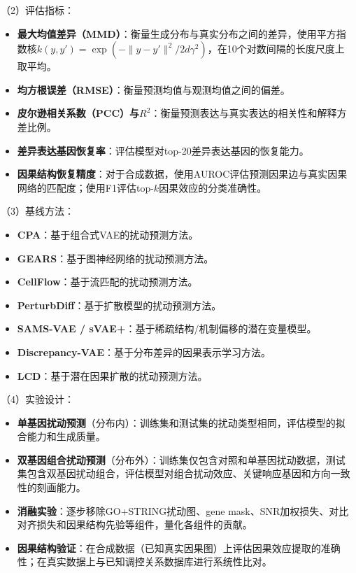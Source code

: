 （2）评估指标：
\begin{itemize}
    \item \textbf{最大均值差异（MMD）}：衡量生成分布与真实分布之间的差异，使用平方指数核$k(y, y') = \exp(-\|y-y'\|^2 / 2d\gamma^2)$，在10个对数间隔的长度尺度上取平均。
    \item \textbf{均方根误差（RMSE）}：衡量预测均值与观测均值之间的偏差。
    \item \textbf{皮尔逊相关系数（PCC）与$R^2$}：衡量预测表达与真实表达的相关性和解释方差比例。
    \item \textbf{差异表达基因恢复率}：评估模型对top-20差异表达基因的恢复能力。
    \item \textbf{因果结构恢复精度}：对于合成数据，使用AUROC评估预测因果边与真实因果网络的匹配度；使用F1评估top-$k$因果效应的分类准确性。
\end{itemize}

（3）基线方法：
\begin{itemize}
    \item \textbf{CPA}\cite{lotfollahi2023contextualization}：基于组合式VAE的扰动预测方法。
    \item \textbf{GEARS}\cite{roohani2024gears}：基于图神经网络的扰动预测方法。
    \item \textbf{CellFlow}\cite{huguet2024cellflow}：基于流匹配的扰动预测方法。
    \item \textbf{PerturbDiff}\cite{roman2024perturbdiff}：基于扩散模型的扰动预测方法。
    \item \textbf{SAMS-VAE / sVAE+}\cite{bereket2023sams, lopez2022svae}：基于稀疏结构/机制偏移的潜在变量模型。
    \item \textbf{Discrepancy-VAE}\cite{zhang2023identifiability}：基于分布差异的因果表示学习方法。
    \item \textbf{LCD}\cite{lorch2025latent}：基于潜在因果扩散的扰动预测方法。
\end{itemize}

（4）实验设计：
\begin{itemize}
    \item \textbf{单基因扰动预测}（分布内）：训练集和测试集的扰动类型相同，评估模型的拟合能力和生成质量。
    \item \textbf{双基因组合扰动预测}（分布外）：训练集仅包含对照和单基因扰动数据，测试集包含双基因扰动组合，评估模型对组合扰动效应、关键响应基因和方向一致性的刻画能力。
    \item \textbf{消融实验}：逐步移除GO+STRING扰动图、gene mask、SNR加权损失、对比对齐损失和因果结构先验等组件，量化各组件的贡献。
    \item \textbf{因果结构验证}：在合成数据（已知真实因果图）上评估因果效应提取的准确性；在真实数据上与已知调控关系数据库进行系统性比对。
\end{itemize}

